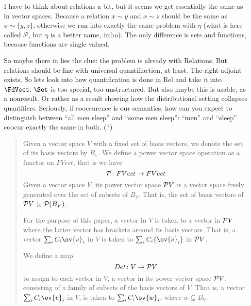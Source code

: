 I have to think about relations a bit, but it seems we get essentially
the same as in vector spaces. Because a relation $x \sim y$ and $x \sim z$
should be the same as $x \sim \{y,z\}$, otherwise we run into exactly the
same problem with $\eta$ (what is here called $\mathcal{P}$, but
$\eta$ is a better name, imho).  The only difference is sets
and functions, because functions are single valued. 

So maybe there in lies the clue: the problem is already with
Relations. But relations should be fine with universal quantifiaction,
at least. The right adjoint exists. So lets look into how
quantification is done in Rel and take it into $\FdVect$. $\Set$ is
too special, too unstructured. But also maybe this is usable, as a
nonresult. Or rather as a result showing how the distributional
setting collapses quantifiers. Seriously, if cooccurence is our
semantics, how can you expect to distinguish between ``all men sleep''
and ``some men sleep'': ``men'' and ``sleep'' coocur exactly the same
in both. (?)





\begin{quote}{\footnotesize
Given a vector space $V$ with a fixed set of basis vectors, we denote the set of its  basis vectors by $B_V$.  We define a power vector space operation as a functor on $FVect$, that is we have 
\[
{\cal P} \colon FVect \to FVect
\]
Given a vector space $V$, its power vector space ${\cal P}V$ is a vector space freely generated over the set of subsets of $B_V$.  That is, the set of basis vectors of ${\cal P}V$ is ${\cal P}(B_V)$. 

For the purpose of this paper, a vector in $V$ is taken to a vector in ${\cal P}V$ where the latter vector has brackets around its basis vectors. That is,  a vector $\sum_i C_i \ov{v}_i$ in $V$ is taken to $\sum_i C_i \{\ov{v}_i\}$ in ${\cal P}V$. 

We define a map 
\[
Det \colon V \to {\cal P}V
\]
to assign  to each vector in $V$, a vector in its power vector space
${\cal P}V$, consisting of a family of subsets of the basis vectors of
$V$.  That is, a vector $\sum_i C_i \ov{v}_i$ in $V$, is taken to
$\sum_i C_i \ov{w}_i$, where $w \subseteq B_V$. 
}\end{quote}